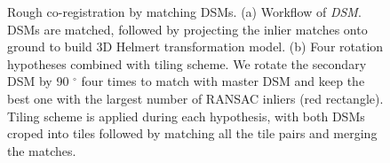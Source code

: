 \begin{figure}[htbp]
    \begin{center}
        \caption{Rough co-registration by matching DSMs. (a) Workflow of \textit{DSM}. DSMs are matched, followed by projecting the inlier matches onto ground to build 3D Helmert transformation model. (b) Four rotation hypotheses combined with tiling scheme. We rotate the secondary DSM by 90 $^\circ$ four times to match with master DSM and keep the best one with the largest number of RANSAC inliers (red rectangle). Tiling scheme is applied during each hypothesis, with both DSMs croped into tiles followed by matching all the tile pairs and merging the matches.}
        \label{WorkflowDSM}
    \end{center}
\end{figure}

